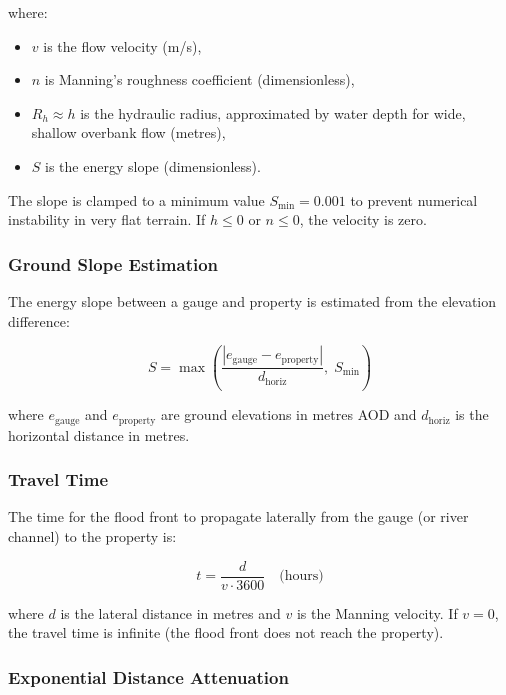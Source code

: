 \documentclass[11pt,a4paper]{article}
\begin{document}
\noindent where:
\begin{itemize}[nosep]
    \item $v$ is the flow velocity (m/s),
    \item $n$ is Manning's roughness coefficient (dimensionless),
    \item $R_h \approx h$ is the hydraulic radius, approximated by water depth for wide,
          shallow overbank flow (metres),
    \item $S$ is the energy slope (dimensionless).
\end{itemize}

\noindent The slope is clamped to a minimum value $S_{\min} = 0.001$ to prevent numerical
instability in very flat terrain. If $h \leq 0$ or $n \leq 0$, the velocity is zero.

\subsubsection{Ground Slope Estimation}

The energy slope between a gauge and property is estimated from the elevation difference:

\begin{equation}
    S = \max\!\left(\frac{|e_{\text{gauge}} - e_{\text{property}}|}{d_{\text{horiz}}},
    \; S_{\min}\right)
    \label{eq:slope}
\end{equation}

\noindent where $e_{\text{gauge}}$ and $e_{\text{property}}$ are ground elevations in
metres AOD and $d_{\text{horiz}}$ is the horizontal distance in metres.

\subsubsection{Travel Time}

The time for the flood front to propagate laterally from the gauge (or river channel) to
the property is:

\begin{equation}
    t = \frac{d}{v \cdot 3600} \quad \text{(hours)}
    \label{eq:travel_time}
\end{equation}

\noindent where $d$ is the lateral distance in metres and $v$ is the Manning velocity.
If $v = 0$, the travel time is infinite (the flood front does not reach the property).

\subsubsection{Exponential Distance Attenuation}
\end{document}
